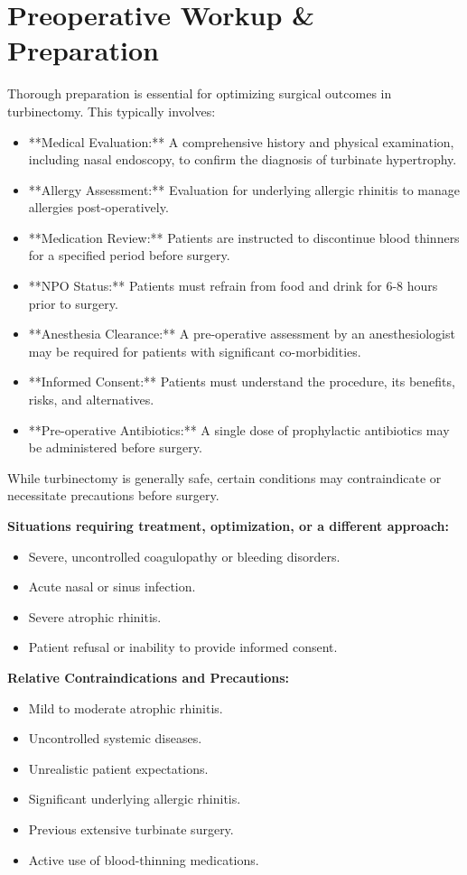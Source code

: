 \section*{Preoperative Workup \& Preparation}
Thorough preparation is essential for optimizing surgical outcomes in turbinectomy. This typically involves:

\begin{itemize}
  \item **Medical Evaluation:** A comprehensive history and physical examination, including nasal endoscopy, to confirm the diagnosis of turbinate hypertrophy.
  \item **Allergy Assessment:** Evaluation for underlying allergic rhinitis to manage allergies post-operatively.
  \item **Medication Review:** Patients are instructed to discontinue blood thinners for a specified period before surgery.
  \item **NPO Status:** Patients must refrain from food and drink for 6-8 hours prior to surgery.
  \item **Anesthesia Clearance:** A pre-operative assessment by an anesthesiologist may be required for patients with significant co-morbidities.
  \item **Informed Consent:** Patients must understand the procedure, its benefits, risks, and alternatives.
  \item **Pre-operative Antibiotics:** A single dose of prophylactic antibiotics may be administered before surgery.
\end{itemize}

While turbinectomy is generally safe, certain conditions may contraindicate or necessitate precautions before surgery.

\textbf{Situations requiring treatment, optimization, or a different approach:}
\begin{itemize}
  \item Severe, uncontrolled coagulopathy or bleeding disorders.
  \item Acute nasal or sinus infection.
  \item Severe atrophic rhinitis.
  \item Patient refusal or inability to provide informed consent.
\end{itemize}

\textbf{Relative Contraindications and Precautions:}
\begin{itemize}
  \item Mild to moderate atrophic rhinitis.
  \item Uncontrolled systemic diseases.
  \item Unrealistic patient expectations.
  \item Significant underlying allergic rhinitis.
  \item Previous extensive turbinate surgery.
  \item Active use of blood-thinning medications.
\end{itemize}

